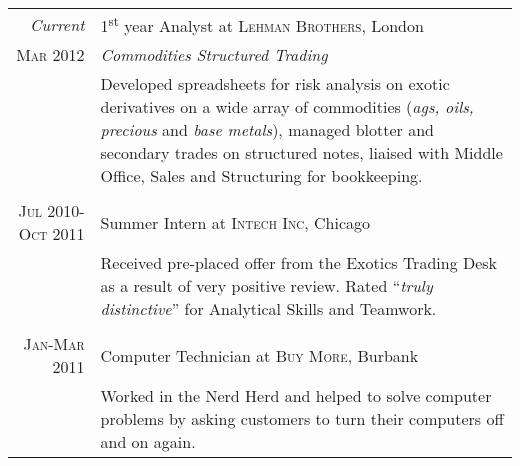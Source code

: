 \documentclass[a4paper,10pt]{article} %
\begin{document}
\begin{tabular}{r|p{11cm}}
  \emph{Current}             & 1\textsuperscript{st} year Analyst at \textsc{Lehman Brothers}, London                                                                                                                                                                                                                             \\
  \textsc{Mar 2012}          & \emph{Commodities Structured Trading}                                                                                                                                                                                                                                                              \\ 
                             & \footnotesize{Developed spreadsheets for risk analysis on exotic derivatives on a wide array of commodities (\textit{ags, oils, precious} and \textit{base metals}), managed blotter and secondary trades on structured notes, liaised with Middle Office, Sales and Structuring for bookkeeping.} \\
  \multicolumn{2}{c}{} \\
  
  
  \textsc{Jul 2010-Oct 2011} & Summer Intern at \textsc{Intech Inc}, Chicago \emph{}                                                                                                                                                                                                                                              \\
                             & \footnotesize{Received pre-placed offer from the Exotics Trading Desk as a result of very positive review. Rated ``\emph{truly distinctive}'' for Analytical Skills and Teamwork.}                                                                                                                 \\
  \multicolumn{2}{c}{} \\
  
  
  \textsc{Jan-Mar 2011}      & Computer Technician at \textsc{Buy More}, Burbank \emph{}                                                                                                                                                                                                                                          \\
                             & \footnotesize{Worked in the Nerd Herd and helped to solve computer problems by asking customers to turn their computers off and on again.}                                                                                                                                                         
\end{tabular}
\end{document}

